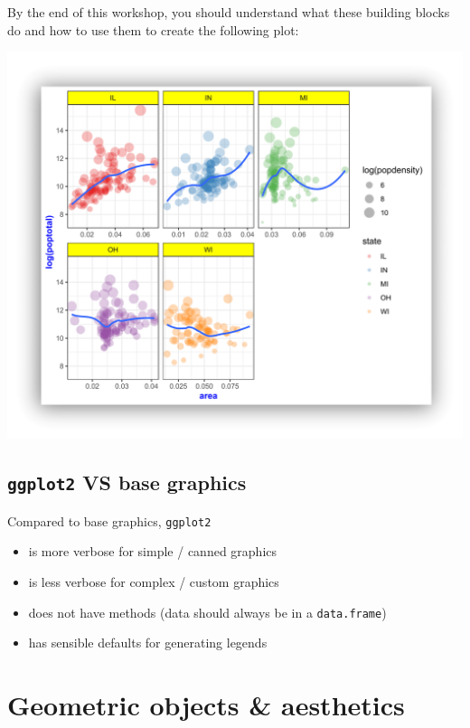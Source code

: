 \documentclass[
]{book}
\providecommand{\tightlist}{%
  \setlength{\itemsep}{0pt}\setlength{\parskip}{0pt}}
\begin{document}
By the end of this workshop, you should understand what these building blocks do and
how to use them to create the following plot:

\includegraphics{R/Rgraphics/images/final_plot.png}

\hypertarget{ggplot2-vs-base-graphics}{%
\subsection{\texorpdfstring{\texttt{ggplot2} VS base graphics}{ggplot2 VS base graphics}}\label{ggplot2-vs-base-graphics}}

Compared to base graphics, \texttt{ggplot2}

\begin{itemize}
\tightlist
\item
  is more verbose for simple / canned graphics
\item
  is less verbose for complex / custom graphics
\item
  does not have methods (data should always be in a \texttt{data.frame})
\item
  has sensible defaults for generating legends
\end{itemize}

\hypertarget{geometric-objects-aesthetics}{%
\section{Geometric objects \& aesthetics}\label{geometric-objects-aesthetics}}
\end{document}
